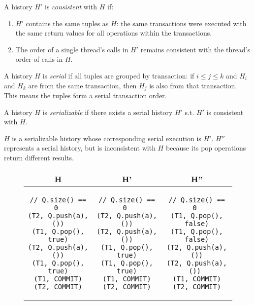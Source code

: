 \begin{defn}
    A history $H'$ is \emph{consistent} with $H$ if:
    \begin{enumerate}
        \item $H'$ contains the same tuples as $H$: the same transactions were executed with the same return values for all operations within the transactions.
        \item The order of a single thread's calls in $H'$ remains consistent with the thread's order of calls in $H$.
    \end{enumerate}
\end{defn}

\begin{defn}
    A history $H$ is \emph{serial} if all tuples are grouped by transaction: if $i\le j\le k$ and $H_i$ and $H_k$ are from the same transaction, then $H_j$ is also from that transaction. This means the tuples form a serial transaction order.
\end{defn}
\begin{defn}
    A history $H$ is \emph{serializable} if there exists a serial history $H'$ s.t. $H'$ is consistent with $H$.

\end{defn}

\begin{eg}
    $H$ is a serializable history whose corresponding serial execution is $H'$. $H''$ represents a serial history, but is inconsistent with $H$ because its pop operations return different results.
\begin{figure}[H]
\singlespacing   
   \begin{tabular}{c|c|c}
H & H' & H''\\
\hline
\begin{lstlisting}
// Q.size() == 0 
(T2, Q.push(a), ())
(T1, Q.pop(), true)
(T2, Q.push(a), ())
(T1, Q.pop(), true)
(T1, COMMIT)
(T2, COMMIT)
\end{lstlisting} & 
\begin{lstlisting}
// Q.size() == 0 
(T2, Q.push(a), ())
(T2, Q.push(a), ())
(T1, Q.pop(), true)
(T1, Q.pop(), true)
(T1, COMMIT)
(T2, COMMIT)
\end{lstlisting} &
\begin{lstlisting}
// Q.size() == 0 
(T1, Q.pop(), false)
(T1, Q.pop(), false)
(T2, Q.push(a), ())
(T2, Q.push(a), ()) 
(T1, COMMIT)
(T2, COMMIT)
\end{lstlisting}
\end{tabular}
\end{figure}
\end{eg}

